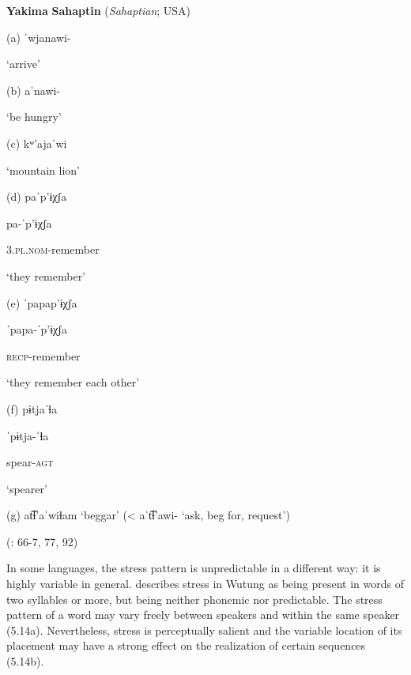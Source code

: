 \ea\label{ex:(5.13)}
  \textbf{Yakima} \textbf{Sahaptin} (\textit{Sahaptian}; USA)



(a)  ˈwjanawi{}-



‘arrive’



(b)  aˈnawi{}-



‘be hungry’



(c)  kʷ’ajaˈwi



‘mountain lion’



(d)  paˈp’ɨχʃa



pa{}-ˈp’ɨχʃa



3.\textsc{pl.nom}{}-remember



‘they remember’



(e)  ˈpapap’ɨχʃa



ˈpapa{}-ˈp’ɨχʃa



\textsc{recp}{}-remember



‘they remember each other’



(f)  pɨtjaˈɬa



ˈpɨtja{}-ˈɬa



spear-\textsc{agt}



‘spearer’



(g)  at͡ɬ’aˈwiɬam ‘beggar’ (< aˈt͡ɬ’awi{}- ‘ask, beg for, request’)



(\citealt{HargusBeavert2005}: 66-7, 77, 92)
\z



  In some languages, the stress pattern is unpredictable in a different way: it is highly variable in general. \citet{Marmion2010} describes stress in Wutung as being present in words of two syllables or more, but being neither phonemic nor predictable. The stress pattern of a word may vary freely between speakers and within the same speaker (5.14a). Nevertheless, stress is perceptually salient and the variable location of its placement may have a strong effect on the realization of certain sequences (5.14b).



